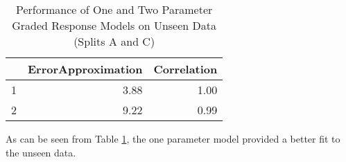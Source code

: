 \documentclass{article}
\begin{document}
\begin{table}[ht]
\centering
\begin{tabular}{rrr}
  \hline
 & ErrorApproximation & Correlation \\ 
  \hline
1 & 3.88 & 1.00 \\ 
  2 & 9.22 & 0.99 \\ 
   \hline
\end{tabular}
\caption{Performance of One and Two Parameter Graded Response Models on Unseen Data (Splits A and C)} 
\label{tab:poshealth2btest}
\end{table}
As can be seen from Table \ref{tab:poshealth2btest}, the one parameter model provided a better fit to the unseen data. 
















\end{document}
